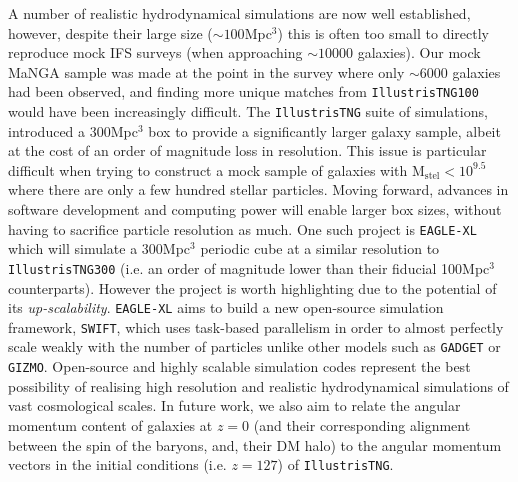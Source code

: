 A number of realistic hydrodynamical simulations are now well established, however, despite their large size ($\sim 100$Mpc$^3$) this is often too small to directly reproduce mock IFS surveys (when approaching $\sim 10000$ galaxies). Our mock MaNGA sample was made at the point in the survey where only $\sim$6000 galaxies had been observed, and finding more unique matches from \texttt{IllustrisTNG100} would have been increasingly difficult. The \texttt{IllustrisTNG} suite of simulations, introduced a 300Mpc$^3$ box to provide a significantly larger galaxy sample, albeit at the cost of an order of magnitude loss in resolution. This issue is particular difficult when trying to construct a mock sample of galaxies with $\mathrm{M_{stel} < 10^{9.5}}$ where there are only a few hundred stellar particles. Moving forward, advances in software development and computing power will enable larger box sizes, without having to sacrifice particle resolution as much. One such project is \texttt{EAGLE-XL} which will simulate a 300Mpc$^{3}$ periodic cube at a similar resolution to \texttt{IllustrisTNG300} (i.e. an order of magnitude lower than their fiducial 100Mpc$^3$ counterparts). However the project is worth highlighting due to the potential of its \textit{up-scalability}. \texttt{EAGLE-XL} aims to build a new open-source simulation framework, \texttt{SWIFT}, which uses task-based parallelism in order to almost perfectly scale weakly with the number of particles unlike other models such as \texttt{GADGET} or \texttt{GIZMO}. Open-source and highly scalable simulation codes represent the best possibility of realising high resolution and realistic hydrodynamical simulations of vast cosmological scales. In future work, we also aim to relate the angular momentum content of galaxies at $z=0$ (and their corresponding alignment between the spin of the baryons, and, their DM halo) to the angular momentum vectors in the initial conditions (i.e. $z = 127$) of \texttt{IllustrisTNG}.